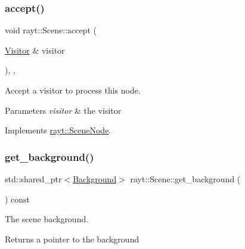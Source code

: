 \subsubsection{\texorpdfstring{accept()}{accept()}}
{\footnotesize\ttfamily void rayt\+::\+Scene\+::accept (\begin{DoxyParamCaption}\item[{\mbox{\hyperlink{classrayt_1_1_visitor}{Visitor}} \&}]{visitor }\end{DoxyParamCaption})\hspace{0.3cm}{\ttfamily [inline]}, {\ttfamily [override]}, {\ttfamily [virtual]}}



Accept a visitor to process this node. 


\begin{DoxyParams}{Parameters}
{\em visitor} & the visitor \\
\hline
\end{DoxyParams}


Implements \mbox{\hyperlink{classrayt_1_1_scene_node_ad1505599b13aa1cac1f9bba9df7bec4b}{rayt\+::\+Scene\+Node}}.

\mbox{\label{classrayt_1_1_scene_add7bcaeaf2268a63634613d70cc7c345}} 
\subsubsection{\texorpdfstring{get\_background()}{get\_background()}}
{\footnotesize\ttfamily std\+::shared\+\_\+ptr$<$\mbox{\hyperlink{classrayt_1_1_background}{Background}}$>$ rayt\+::\+Scene\+::get\+\_\+background (\begin{DoxyParamCaption}{ }\end{DoxyParamCaption}) const\hspace{0.3cm}{\ttfamily [inline]}}



The scene background. 

\begin{DoxyReturn}{Returns}
a pointer to the background 
\end{DoxyReturn}
\mbox{\label{classrayt_1_1_scene_aae90d3f219fb89a471f84b1653310b33}} 
